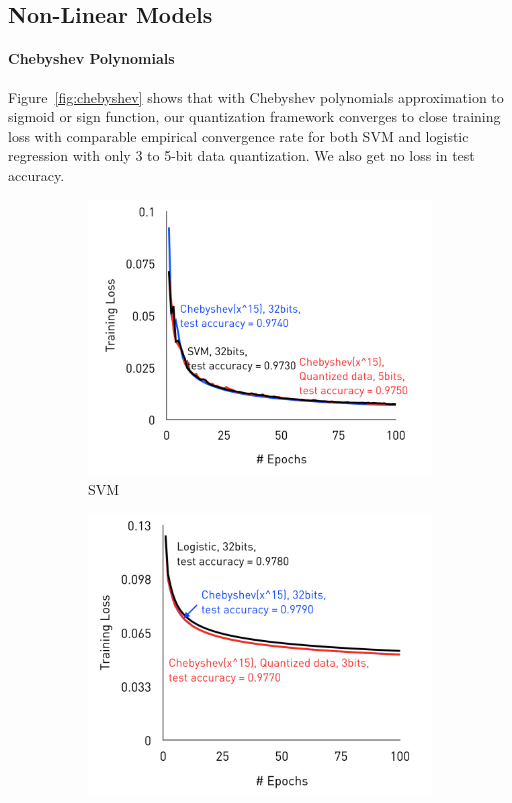 \documentclass{article}
\begin{document}
\subsection{Non-Linear Models}

\paragraph{Chebyshev Polynomials}

Figure~\ref{fig:chebyshev} shows that with Chebyshev polynomials approximation to sigmoid 
or sign function, our quantization framework
converges to close training loss with comparable
empirical convergence rate for both SVM and logistic regression
with only 3 to 5-bit data quantization. We also get no loss in test accuracy.

\begin{figure}[h]
\centering
    \begin{subfigure}[h]{.4\columnwidth}
    \includegraphics[width=\columnwidth]{final-experiments/SVM-Chebyshev} 
    \caption{SVM}
    \end{subfigure}
    \begin{subfigure}[h]{.4\columnwidth}
    \includegraphics[width=\columnwidth]{final-experiments/Logistic-Chebyshev} 

\end{subfigure}
\end{figure}
\end{document}
